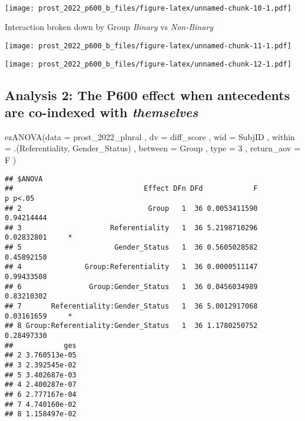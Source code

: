 \documentclass[
]{article}
\newenvironment{Shaded}{\begin{snugshade}}{\end{snugshade}}
\newcommand{\AttributeTok}[1]{\textcolor[rgb]{0.77,0.63,0.00}{#1}}
\newcommand{\DecValTok}[1]{\textcolor[rgb]{0.00,0.00,0.81}{#1}}
\newcommand{\FunctionTok}[1]{\textcolor[rgb]{0.00,0.00,0.00}{#1}}
\newcommand{\NormalTok}[1]{#1}
\begin{document}
~

\texttt{[image: prost\_2022\_p600\_b\_files/figure-latex/unnamed-chunk-10-1.pdf]}

Interaction broken down by Group \emph{Binary} vs \emph{Non-Binary}

\texttt{[image: prost\_2022\_p600\_b\_files/figure-latex/unnamed-chunk-11-1.pdf]}

\texttt{[image: prost\_2022\_p600\_b\_files/figure-latex/unnamed-chunk-12-1.pdf]}

\hypertarget{analysis-2-the-p600-effect-when-antecedents-are-co-indexed-with-themselves}{%
\subsection{\texorpdfstring{Analysis 2: The P600 effect when antecedents
are co-indexed with
\emph{themselves}}{Analysis 2: The P600 effect when antecedents are co-indexed with themselves}}\label{analysis-2-the-p600-effect-when-antecedents-are-co-indexed-with-themselves}}

\begin{Shaded}
\begin{Highlighting}[]
\FunctionTok{ezANOVA}\NormalTok{(}\AttributeTok{data =}\NormalTok{ prost\_2022\_plural}
\NormalTok{              , }\AttributeTok{dv =}\NormalTok{ diff\_score}
\NormalTok{              , }\AttributeTok{wid =}\NormalTok{ SubjID}
\NormalTok{              , }\AttributeTok{within =}\NormalTok{ .(Referentiality, Gender\_Status)}
\NormalTok{              , }\AttributeTok{between =}\NormalTok{ Group}
\NormalTok{              , }\AttributeTok{type =} \DecValTok{3}
\NormalTok{              , }\AttributeTok{return\_aov =}\NormalTok{ F}
\NormalTok{              )}
\end{Highlighting}
\end{Shaded}

\begin{verbatim}
## $ANOVA
##                               Effect DFn DFd            F          p p<.05
## 2                              Group   1  36 0.0053411590 0.94214444      
## 3                     Referentiality   1  36 5.2198710296 0.02832801     *
## 5                      Gender_Status   1  36 0.5605028582 0.45892150      
## 4               Group:Referentiality   1  36 0.0000511147 0.99433508      
## 6                Group:Gender_Status   1  36 0.0456034989 0.83210302      
## 7       Referentiality:Gender_Status   1  36 5.0012917068 0.03161659     *
## 8 Group:Referentiality:Gender_Status   1  36 1.1780250752 0.28497330      
##            ges
## 2 3.760513e-05
## 3 2.392545e-02
## 5 3.402687e-03
## 4 2.400287e-07
## 6 2.777167e-04
## 7 4.740160e-02
## 8 1.158497e-02
\end{verbatim}
\end{document}
